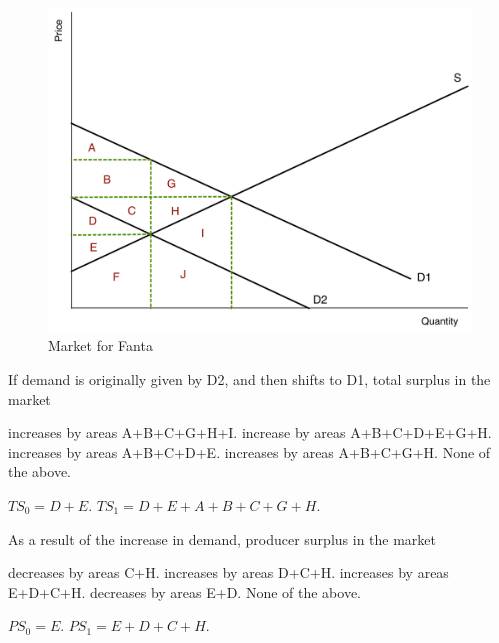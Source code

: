 \documentclass[addpoints,11pt]{exam}
\theoremstyle{definition}
\begin{document}
\begin{questions}
		\begin{figure}[H]
			\centering
			\includegraphics[scale=.45]{Exam1_MC25.pdf}
			\caption{Market for Fanta}
			\label{MC25}
		\end{figure}


		\question \label{blah9} If demand is originally given by D2, and then shifts to D1, total surplus in the market
		
		\begin{choices}
			\choice increases by areas A+B+C+G+H+I.
			\choice increase by areas A+B+C+D+E+G+H.
			\choice increases by areas A+B+C+D+E.
			\CorrectChoice increases by areas A+B+C+G+H.
			\choice None of the above.
		\end{choices}
		
		\begin{solution}
			$TS_0 = D+E.$ $TS_1 = D + E + A + B + C  + G + H$.
		\end{solution}
		
		\question \label{blah10} As a result of the increase in demand, producer surplus in the market 
			
			\begin{choices}
					\choice decreases by areas C+H.
					\CorrectChoice increases by areas D+C+H.
					\choice increases by areas E+D+C+H.
					\choice decreases by areas E+D.
					\choice None of the above.
				\end{choices}
				
		\begin{solution}
			$PS_0 = E.$ $PS_1 = E + D + C + H$.
		\end{solution}
		
\end{questions}
\end{document}
